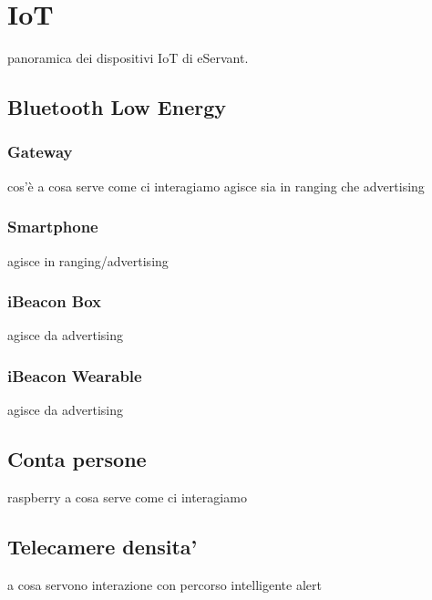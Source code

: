 \chapter{IoT}
panoramica dei dispositivi IoT di eServant.

\section{Bluetooth Low Energy}
\subsection{Gateway}
cos'è
a cosa serve
come ci interagiamo
agisce sia in ranging che advertising

\subsection{Smartphone}
agisce in ranging/advertising

\subsection{iBeacon Box}
agisce da advertising

\subsection{iBeacon Wearable}
agisce da advertising

\section{Conta persone}
raspberry
a cosa serve
come ci interagiamo

\section{Telecamere densita'}
a cosa servono 
interazione con percorso intelligente
alert